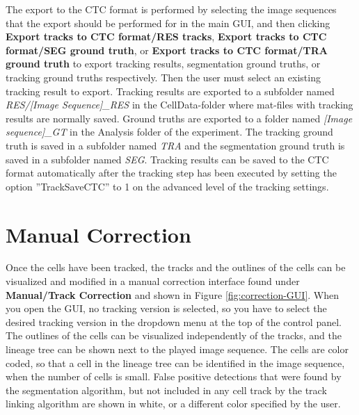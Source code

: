 \documentclass[a4paper, oneside, onecolumn, 11pt]{article}
\newcommand{\menu}[1]{\textbf{#1}}
\newcommand{\file}[1]{\emph{#1}}
\newcommand{\setting}[1]{''#1''}
\begin{document}
The export to the CTC format is performed by selecting the image sequences that the export should be performed for in the main GUI, and then clicking \menu{Export tracks to CTC format/RES tracks}, \menu{Export tracks to CTC format/SEG ground truth}, or \menu{Export tracks to CTC format/TRA ground truth} to export tracking results, segmentation ground truths, or tracking ground truths respectively. Then the user must select an existing tracking result to export. Tracking results are exported to a subfolder named \file{RES/[Image Sequence]\_RES} in the CellData-folder where mat-files with tracking results are normally saved. Ground truths are exported to a folder named \file{[Image sequence]\_GT} in the Analysis folder of the experiment. The tracking ground truth is saved in a subfolder named \file{TRA} and the segmentation ground truth is saved in a subfolder named \file{SEG}. Tracking results can be saved to the CTC format automatically after the tracking step has been executed by setting the option \setting{TrackSaveCTC} to 1 on the advanced level of the tracking settings.

\section{Manual Correction}
\label{sec:manual-correction}
Once the cells have been tracked, the tracks and the outlines of the cells can be visualized and modified in a manual correction interface found under \menu{Manual/\allowbreak Track Correction} and shown in Figure \ref{fig:correction-GUI}. When you open the GUI, no tracking version is selected, so you have to select the desired tracking version in the dropdown menu at the top of the control panel. The outlines of the cells can be visualized independently of the tracks, and the lineage tree can be shown next to the played image sequence. The cells are color coded, so that a cell in the lineage tree can be identified in the image sequence, when the number of cells is small. False positive detections that were found by the segmentation algorithm, but not included in any cell track by the track linking algorithm are shown in white, or a different color specified by the user.
\end{document}
